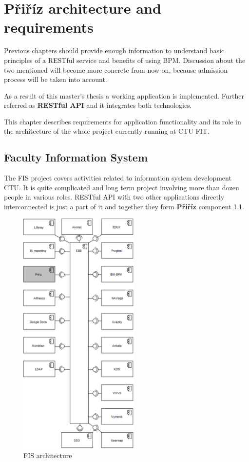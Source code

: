 \chapter{Přiříz architecture and requirements}\label{cha:architecture}

	Previous chapters should provide enough information to understand basic principles of a RESTful service and benefits of
	using BPM. Discussion about the two mentioned will become more concrete from now on, because admission process will be
	taken into account.
	
	As a result of this master's thesis a working application is implemented. Further referred as \textbf{RESTful API} and
	it integrates both technologies.
	 	
	This chapter describes requirements for application functionality and its role in the architecture of the whole project
	currently running at CTU FIT.

	\section{Faculty Information System}
	
	The \gls{FIS} project covers activities related to information system development CTU. It is quite complicated and long
	term project involving more than dozen people in various roles. RESTful API with two other applications directly
	interconnected is just a part of it and together they form \textbf{Přiříz} component \ref{fig:fis_architecture}.
	
	\newpage
	\begin{figure}[h]
		\label{fig:fis_architecture}
	  	\centering
	    \includegraphics[width=6cm]{figures/fis_architecture}
	  	\caption{FIS architecture}
	\end{figure}
	
